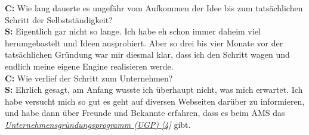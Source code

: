 \documentclass[10pt,a4paper,ngerman,twoside]{article} %
\begin{document}
\textbf{C:} Wie lang dauerte es ungefähr vom Aufkommen der Idee bis zum tatsächlichen Schritt der Selbstständigkeit? \\
\textbf{S:} Eigentlich gar nicht so lange. Ich habe eh schon immer daheim viel herumgebastelt und Ideen ausprobiert. Aber so drei bis vier Monate vor der tatsächlichen Gründung war mir diesmal klar, dass ich den Schritt wagen und endlich meine eigene Engine realisieren werde.\\
\textbf{C:} Wie verlief der Schritt zum Unternehmen? \\
\textbf{S:} Ehrlich gesagt, am Anfang wusste ich überhaupt nicht, was mich erwartet. Ich habe versucht mich so gut es geht auf diversen Webseiten darüber zu informieren, und habe dann über Freunde und Bekannte erfahren, dass es beim AMS das \href{http://www.ams.at/sfa/14081_10435.html}{\textit{Unternehmensgründungsprogramm (UGP) [4]}} gibt.
\end{document}
